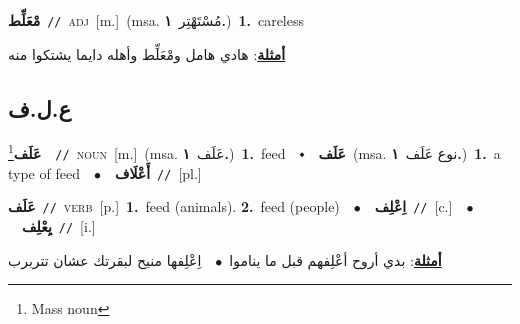 \documentclass[10pt,a4paper,twoside]{article} %
\begin{document}
\begin{multicols}{2}
{\setlength\topsep{0pt}\textbf{\foreignlanguage{arabic}{مْعَلِّط}}\ {\color{gray}\texttt{//}\color{black}}\ \textsc{adj}\ [m.]\ \color{gray}(msa. \foreignlanguage{arabic}{مُسْتَهْتِر}~\foreignlanguage{arabic}{\textbf{١.}})\color{black}\ \textbf{1.}~careless\  \begin{flushright}\color{gray}\foreignlanguage{arabic}{\textbf{\underline{\foreignlanguage{arabic}{أمثلة}}}: هادي هامل ومْعَلِّط وأهله دايما يشتكوا منه}\end{flushright}\color{black}} \vspace{2mm}

\vspace{-3mm}
\subsection*{\color{blue}\foreignlanguage{arabic}{ع.ل.ف}\color{blue}{}} 

{\setlength\topsep{0pt}\textbf{\foreignlanguage{arabic}{عَلَف}}\footnote{Mass noun}\ \ {\color{gray}\texttt{//}\color{black}}\ \textsc{noun}\ [m.]\ \color{gray}(msa. \foreignlanguage{arabic}{عَلَف}~\foreignlanguage{arabic}{\textbf{١.}})\color{black}\ \textbf{1.}~feed\ \ $\smblkdiamond$\ \ \setlength\topsep{0pt}\textbf{\foreignlanguage{arabic}{عَلَف}}\ \color{gray}(msa. \foreignlanguage{arabic}{نوع عَلَف}~\foreignlanguage{arabic}{\textbf{١.}})\color{black}\ \textbf{1.}~a type of feed\ \ $\bullet$\ \ \setlength\topsep{0pt}\textbf{\foreignlanguage{arabic}{أَعْلَاف}}\ {\color{gray}\texttt{//}\color{black}}\ [pl.]\ } \vspace{2mm}

{\setlength\topsep{0pt}\textbf{\foreignlanguage{arabic}{عَلَف}}\ {\color{gray}\texttt{//}\color{black}}\ \textsc{verb}\ [p.]\ \textbf{1.}~feed (animals).  \textbf{2.}~feed (people)\ \ $\bullet$\ \ \setlength\topsep{0pt}\textbf{\foreignlanguage{arabic}{اِعْلِف}}\ {\color{gray}\texttt{//}\color{black}}\ [c.]\ \ $\bullet$\ \ \setlength\topsep{0pt}\textbf{\foreignlanguage{arabic}{يِعْلِف}}\ {\color{gray}\texttt{//}\color{black}}\ [i.]\  \begin{flushright}\color{gray}\foreignlanguage{arabic}{\textbf{\underline{\foreignlanguage{arabic}{أمثلة}}}: بدي أروح أعْلِفهم قبل ما يناموا\ $\bullet$\ \  اِعْلِفها منيح لبقرتك عشان تتربرب}\end{flushright}\color{black}} \vspace{2mm}


\end{multicols}
\end{document}
